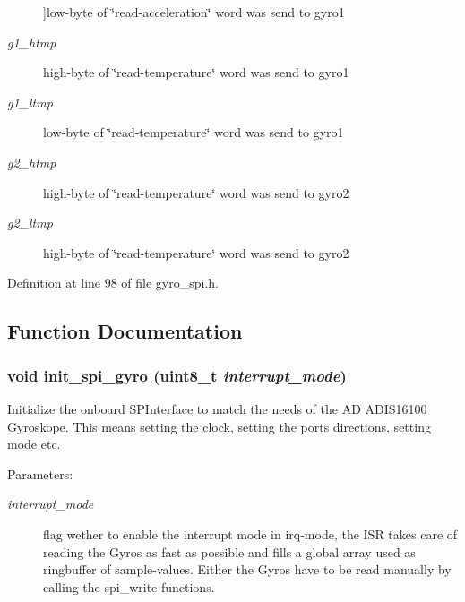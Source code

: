 \begin{Desc}
\begin{description}
{}]low-byte of \char`\"{}read-acceleration\char`\"{} word was send to gyro1 \item[{\em 
g1\_\-htmp\label{group__ro__spi_gg5a3108ec978dba9260f83fcb22b9869d7b62ff87e6785a84e859a7b2fc8a9281}
}]high-byte of \char`\"{}read-temperature\char`\"{} word was send to gyro1 \item[{\em 
g1\_\-ltmp\label{group__ro__spi_gg5a3108ec978dba9260f83fcb22b9869d1f0d734de79b016af02ed02dee9977e1}
}]low-byte of \char`\"{}read-temperature\char`\"{} word was send to gyro1 \item[{\em 
g2\_\-htmp\label{group__ro__spi_gg5a3108ec978dba9260f83fcb22b9869ddbea7d727a42db801d618068634aaa80}
}]high-byte of \char`\"{}read-temperature\char`\"{} word was send to gyro2 \item[{\em 
g2\_\-ltmp\label{group__ro__spi_gg5a3108ec978dba9260f83fcb22b9869ddaa21ba415939f952c8490b9d73221aa}
}]high-byte of \char`\"{}read-temperature\char`\"{} word was send to gyro2 \end{description}
\end{Desc}



Definition at line 98 of file gyro\_\-spi.h.

\subsection{Function Documentation}
\subsubsection{\setlength{\rightskip}{0pt plus 5cm}void init\_\-spi\_\-gyro (uint8\_\-t {\em interrupt\_\-mode})}\label{group__ro__spi_g67c94e3e04f57f7245efad8100c05e3f}


Initialize the onboard SPInterface to match the needs of the AD ADIS16100 Gyroskope. This means setting the clock, setting the ports directions, setting mode etc. \begin{Desc}
\item[Parameters:]
\begin{description}
\item[{\em interrupt\_\-mode}]flag wether to enable the interrupt mode in irq-mode, the ISR takes care of reading the Gyros as fast as possible and fills a global array used as ringbuffer of sample-values. Either the Gyros have to be read manually by calling the spi\_\-write-functions. \end{description}
\end{Desc}


